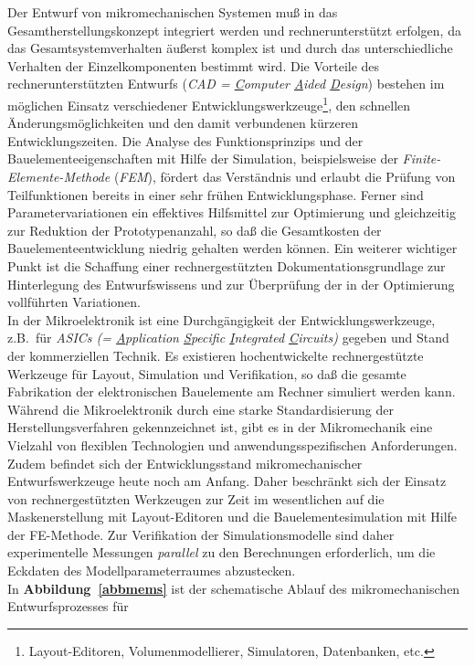 Der Entwurf von mikromechanischen Systemen muß in das
Gesamtherstellungskonzept integriert werden und rechnerunterstützt
erfolgen, da das Gesamtsystemverhalten äußerst komplex ist und durch das
unterschiedliche Verhalten der Einzelkomponenten bestimmt wird. Die
Vorteile des rechnerunterstützten Entwurfs ({\em CAD = \underline{C}omputer
\underline{A}ided \underline{D}esign}) bestehen im möglichen Einsatz
verschiedener Entwicklungswerkzeuge\footnote{Layout-Editoren,
Volumenmodellierer, Simulatoren, Datenbanken, etc.},
den schnellen Änderungsmöglichkeiten
und den damit verbundenen kürzeren Entwicklungszeiten. Die Analyse des
Funktionsprinzips und der Bauelementeeigenschaften mit Hilfe der Simulation,
beispielsweise der {\em Finite-Elemente-Methode} ({\em FEM}), fördert das
Verständnis und erlaubt die Prüfung von Teilfunktionen bereits
in einer sehr frühen Entwicklungsphase. Ferner sind Parametervariationen
ein effektives Hilfsmittel zur Optimierung und gleichzeitig zur
Reduktion der Proto\-typenanzahl, so daß die Gesamtkosten der
Bauelementeentwicklung niedrig gehalten werden können. Ein weiterer
wichtiger Punkt ist die Schaffung einer rechnergestützten
Dokumentationsgrundlage zur Hinterlegung des Entwurfswissens und zur
Überprüfung der in der Optimierung vollführten Variationen.\\
In der Mikroelektronik ist eine
Durchgängigkeit der Entwicklungswerkzeuge, z.B.\ für {\em ASICs (=
\underline{A}pplication \underline{S}pecific \underline{I}ntegrated
\underline{C}ircuits)} gegeben und Stand der kommerziellen
Technik.  Es existieren hochentwickelte rechnergestützte Werkzeuge für
Layout, Simulation und Verifikation, so daß die gesamte Fabrikation der
elektronischen Bauelemente am Rechner simuliert werden kann. Während
die Mikroelektronik durch eine starke Standardisierung der
Herstellungsverfahren gekennzeichnet ist, gibt es in der Mikromechanik
eine Vielzahl von flexiblen Technologien und anwendungsspezifischen
Anforderungen. Zudem befindet sich der Entwicklungsstand mikromechanischer
Entwurfswerkzeuge heute noch am Anfang. Daher beschränkt sich der
Einsatz von rechnergestützten Werkzeugen zur Zeit im
wesentlichen auf die Maskenerstellung mit Layout-Editoren und die
Bauelemente\-simulation mit Hilfe der FE-Methode. Zur Verifikation der
Simulationsmodelle sind daher experimentelle Messungen {\em parallel}
zu den Berechnungen erforderlich, um die Eckdaten des Modellparameterraumes
abzustecken.\\
%
In {\bf Abbildung~\ref{abbmems}} ist der schematische Ablauf des
mikromechanischen Entwurfsprozesses für
